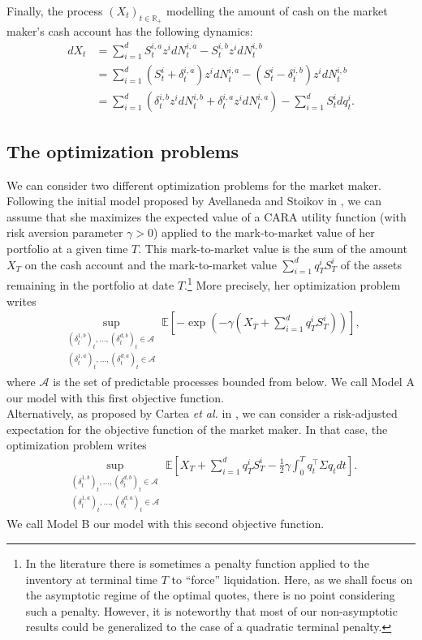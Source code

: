 \documentclass[preprint, 3p]{elsarticle}
\newcommand{\1}{{\chi}}
\newcommand{\Aa}{{\mathcal{A}}}
\begin{document}
Finally, the process $(X_t)_{t \in \mathbb R_+}$ modelling the amount of cash on the market maker's cash account has the following dynamics:
\begin{align*}
dX_t&=\sum\limits_{i=1}^{d} S_t^{i,a}z^i dN_t^{i,a}-S_t^{i,b}z^i dN_t^{i,b}\\
&=\sum\limits_{i=1}^{d}(S_t^i+\delta_t^{i,a})z^i dN_t^{i,a}-(S_t^i-\delta_t^{i,b})z^i dN_t^{i,b}\\
&=\sum\limits_{i=1}^{d}\left(\delta_t^{i,b}z^i dN_t^{i,b} + \delta_t^{i,a} z^i dN_t^{i,a} \right) - \sum\limits_{i=1}^{d} S^i_t dq^i_t.
\end{align*}

\subsection{The optimization problems}
\vspace{3mm}
We can consider two different optimization problems for the market maker. Following the initial model proposed by Avellaneda and Stoikov in \cite{avellaneda2008high}, we can assume that she maximizes the expected value of a CARA utility function (with risk aversion parameter $\gamma>0$) applied to the mark-to-market value of her portfolio at a given time $T$. This mark-to-market value is the sum of the amount $X_T$ on the cash account and the mark-to-market value $\sum\limits_{i=1}^{d}q_T^i S_T^i$ of the assets remaining in the portfolio at date $T$.\footnote{In the literature there is sometimes a penalty function applied to the inventory at terminal time $T$ to ``force'' liquidation. Here, as we shall focus on the asymptotic regime of the optimal quotes, there is no point considering such a penalty. However, it is noteworthy that most of our non-asymptotic results could be generalized to the case of a quadratic terminal penalty.} More precisely, her optimization problem writes
\begin{align*}
\sup_{\substack{(\delta_t^{1,b})_t,\ldots,(\delta_t^{d,b})_t\in\mathcal A\\ (\delta_t^{1,a})_t,\ldots,(\delta_t^{d,a})_t\in\mathcal A}} \mathbb E\left[-\exp \left(-\gamma \left(X_T + \sum\limits_{i=1}^{d}q_T^i S_T^i \right)\right)\right],
\end{align*}
where $\Aa$ is the set of predictable processes bounded from below. We call Model A our model with this first objective function.\\

Alternatively, as proposed by Cartea \emph{et al.} in \cite{cartea2014buy}, we can consider a risk-adjusted expectation for the objective function of the market maker. In that case, the optimization problem writes
\begin{align*}
	\sup_{\substack{(\delta_t^{1,b})_t,\ldots,(\delta_t^{d,b})_t\in\mathcal A\\ (\delta_t^{1,a})_t,\ldots,(\delta_t^{d,a})_t\in\mathcal A}} \mathbb E\left[X_T + \sum_{i=1}^dq_T^iS_T^i -\frac{1}{2}\gamma \int_0^T q_t^\intercal \Sigma q_t dt\right].
\end{align*}
We call Model B our model with this second objective function.\\
\end{document}
